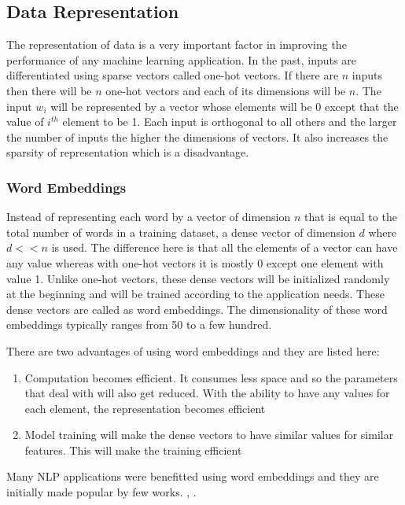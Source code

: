 \documentclass[a4paper, 11pt]{article}
\begin{document}
\subsection{Data Representation}

The representation of data is a very important factor in improving the performance of any machine learning application. In the past, inputs are differentiated using sparse vectors called one-hot vectors. If there are $n$ inputs then there will be  $n$ one-hot vectors and each of its dimensions will be $n$. The input $w_i$ will be represented by a vector whose elements will be 0 except that the value of $i^{th}$ element to be 1. Each input is orthogonal to all others and the larger the number of inputs the higher the dimensions of vectors. It also increases the sparsity of representation which is a disadvantage. 

\subsubsection{Word Embeddings}

Instead of representing each word by a vector of dimension $n$ that is equal to the total number of words in a training dataset, a dense vector of dimension $d$ where $d << n$ is used. The difference here is that all the elements of a vector can have any value whereas with one-hot vectors it is mostly 0 except one element with value 1. Unlike one-hot vectors, these dense vectors will be initialized randomly at the beginning and will be trained according to the application needs. These dense vectors are called as word embeddings. The dimensionality of these word embeddings typically ranges from 50 to a few hundred. 

There are two advantages of using word embeddings and they are listed here:
\begin{enumerate}
\item Computation becomes efficient. It consumes less space and so the parameters that deal with will also get reduced. With the ability to have any values for each element, the representation becomes efficient
\item Model training will make the dense vectors to have similar values for similar features. This will make the training efficient
\end{enumerate}

Many NLP applications were benefitted using word embeddings and they are initially made popular by few works. \parencite{10.5555/944919.944966}, \parencite{Schwenk2006}. 
\end{document}
